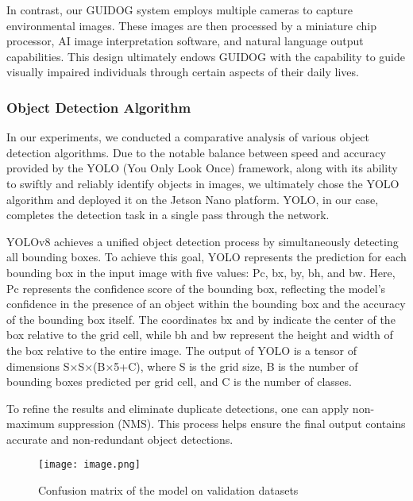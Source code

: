 \documentclass{article}
\begin{document}
In contrast, our GUIDOG system employs multiple cameras to capture environmental images. These images are then processed by a miniature chip processor, AI image interpretation software, and natural language output capabilities. This design ultimately endows GUIDOG with the capability to guide visually impaired individuals through certain aspects of their daily lives.

\subsubsection{Object Detection Algorithm}
In our experiments, we conducted a comparative analysis of various object detection algorithms. Due to the notable balance between speed and accuracy provided by the YOLO (You Only Look Once) framework, along with its ability to swiftly and reliably identify objects in images, we ultimately chose the YOLO algorithm and deployed it on the Jetson Nano platform. YOLO, in our case, completes the detection task in a single pass through the network.

YOLOv8 achieves a unified object detection process by simultaneously detecting all bounding boxes. To achieve this goal, YOLO represents the prediction for each bounding box in the input image with five values: Pc, bx, by, bh, and bw. Here, Pc represents the confidence score of the bounding box, reflecting the model's confidence in the presence of an object within the bounding box and the accuracy of the bounding box itself. The coordinates bx and by indicate the center of the box relative to the grid cell, while bh and bw represent the height and width of the box relative to the entire image. The output of YOLO is a tensor of dimensions S×S×(B×5+C), where S is the grid size, B is the number of bounding boxes predicted per grid cell, and C is the number of classes.

To refine the results and eliminate duplicate detections, one can apply non-maximum suppression (NMS). This process helps ensure the final output contains accurate and non-redundant object detections.

\begin{figure}[h]
    \centering
    \texttt{[image: image.png]}
    \caption{Confusion matrix of the model on validation datasets}
    \label{fig:confusion matrix of our trained model on our trainning datasets}
\end{figure}
\end{document}
